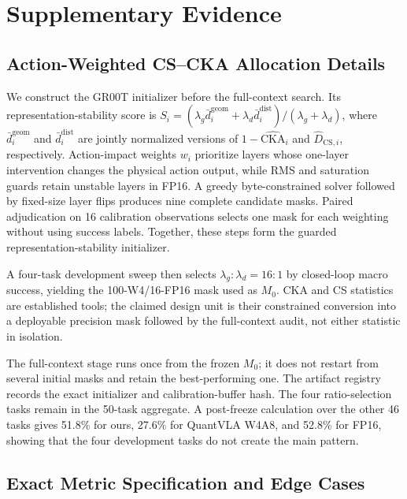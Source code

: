 \section{Supplementary Evidence}
\label{sec:supplement}

\subsection{Action-Weighted CS--CKA Allocation Details}
\label{sec:init_provenance}

We construct the GR00T initializer before the full-context search. Its representation-stability score is $S_i=(\lambda_g\bar d_i^{\mathrm{geom}}+\lambda_d\bar d_i^{\mathrm{dist}})/(\lambda_g+\lambda_d)$, where $\bar d_i^{\mathrm{geom}}$ and $\bar d_i^{\mathrm{dist}}$ are jointly normalized versions of $1-\widehat{\mathrm{CKA}}_i$ and $\widehat D_{\mathrm{CS},i}$, respectively. Action-impact weights $w_i$ prioritize layers whose one-layer intervention changes the physical action output, while RMS and saturation guards retain unstable layers in FP16. A greedy byte-constrained solver followed by fixed-size layer flips produces nine complete candidate masks. Paired adjudication on 16 calibration observations selects one mask for each weighting without using success labels. Together, these steps form the guarded representation-stability initializer.

A four-task development sweep then selects $\lambda_g:\lambda_d=16:1$ by closed-loop macro success, yielding the 100-W4/16-FP16 mask used as $M_0$. CKA and CS statistics are established tools; the claimed design unit is their constrained conversion into a deployable precision mask followed by the full-context audit, not either statistic in isolation.

The full-context stage runs once from the frozen $M_0$; it does not restart from several initial masks and retain the best-performing one. The artifact registry records the exact initializer and calibration-buffer hash. The four ratio-selection tasks remain in the 50-task aggregate. A post-freeze calculation over the other 46 tasks gives 51.8\% for ours, 27.6\% for QuantVLA W4A8, and 52.8\% for FP16, showing that the four development tasks do not create the main pattern.

\subsection{Exact Metric Specification and Edge Cases}
\label{sec:metric_specification}

